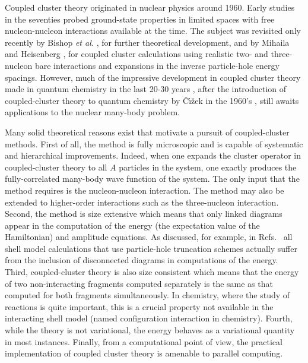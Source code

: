 \documentclass{ws-procs9x6}
\begin{document}
Coupled cluster theory originated in nuclear physics
\cite{coester58,coester60} around 1960.  Early studies in the
seventies \cite{klz78} probed ground-state properties in limited
spaces with free nucleon-nucleon interactions available at the
time. The subject was revisited
only recently by Bishop {\it et al.}
\cite{ticcm}, for further theoretical development, and by Mihaila and
Heisenberg \cite{hm99}, for coupled cluster calculations
using realistic
two- and three-nucleon
bare interactions
and expansions in the
inverse particle-hole energy spacings.
However, much of
the impressive development in
coupled cluster theory made in quantum chemistry in
the last 20-30 years
\cite{comp_chem_rev00,Bartlett95,Paldus99,Piecuch02a,Piecuch02b},
after the introduction of coupled-cluster theory to quantum
chemistry by \v{C}\'{\i}\v{z}ek in the 1960's \cite{cizek66,cizek69},
still awaits applications to the nuclear many-body problem.

Many solid theoretical reasons exist that motivate a pursuit of
coupled-cluster methods. First of all, the method is fully
microscopic and is capable of systematic and hierarchical improvements.
Indeed, when one expands the cluster operator in coupled-cluster theory
to all $A$ particles in the system, one exactly produces the fully-correlated
many-body wave function of the system. The only input that the method
requires is the nucleon-nucleon interaction. 
The method may also be extended
to higher-order interactions such as the three-nucleon interaction.
Second, the method is size extensive which means that only linked
diagrams appear in the computation of the  
energy (the expectation value of the Hamiltonian) and amplitude equations.
As discussed, for example, in Refs.~\cite{comp_chem_rev00,Paldus99} all shell model calculations
that use particle-hole truncation schemes
actually suffer from the inclusion of disconnected diagrams
in computations of the energy.
Third, coupled-cluster theory is also size
consistent which means that the energy of two non-interacting fragments
computed separately is the same as that computed for both fragments
simultaneously. In chemistry, where the study of reactions
is quite important, this is a crucial property not available
in the interacting shell model (named configuration interaction in
chemistry).
Fourth, while the theory
is not variational,
the energy behaves as a variational quantity in most instances.
Finally, from a
computational point of view, the practical implementation of coupled
cluster theory is amenable to parallel computing.
\end{document}
